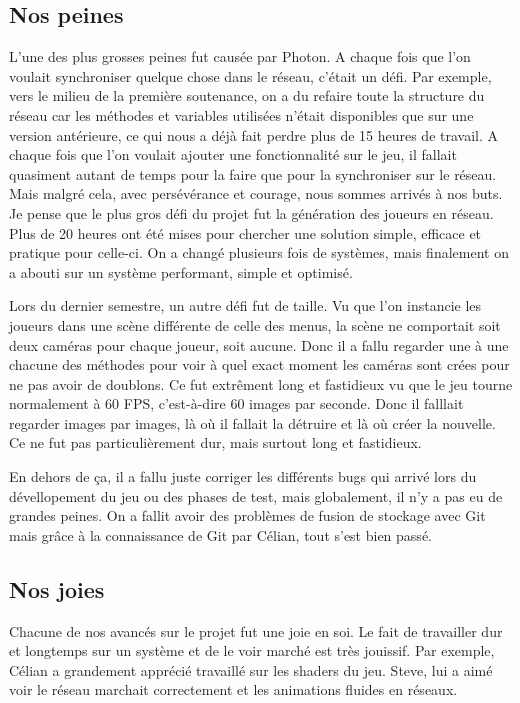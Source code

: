 \documentclass{article}
\begin{document}
\subsection{Nos peines}
L'une des plus grosses peines fut causée par Photon. A chaque fois que l'on voulait synchroniser quelque chose dans le réseau, c'était un défi. Par exemple, vers le milieu de la première soutenance, on a du refaire toute la structure du réseau car les méthodes et variables utilisées n'était disponibles que sur une version antérieure, ce qui nous a déjà fait perdre plus de 15 heures de travail. A chaque fois que l'on voulait ajouter une fonctionnalité sur le jeu, il fallait quasiment autant de temps pour la faire que pour la synchroniser sur le réseau. Mais malgré cela, avec persévérance et courage, nous sommes arrivés à nos buts. Je pense que le plus gros défi du projet fut la génération des joueurs en réseau. Plus de 20 heures ont été mises pour chercher une solution simple, efficace et pratique pour celle-ci. On a changé plusieurs fois de systèmes, mais finalement on a abouti sur un système performant, simple et optimisé. 

Lors du dernier semestre, un autre défi fut de taille. Vu que l'on instancie les joueurs dans une scène différente de celle des menus, la scène ne comportait soit deux caméras pour chaque joueur, soit aucune. Donc il a fallu regarder une à une chacune des méthodes pour voir à quel exact moment les caméras sont crées pour ne pas avoir de doublons. Ce fut extrêment long et fastidieux vu que le jeu tourne normalement à 60 FPS, c'est-à-dire 60 images par seconde. Donc il falllait regarder images par images, là où il fallait la détruire et là où créer la nouvelle. Ce ne fut pas particulièrement dur, mais surtout long et fastidieux.

En dehors de ça, il a fallu juste corriger les différents bugs qui arrivé lors du dévellopement du jeu ou des phases de test, mais globalement, il n'y a pas eu de grandes peines. On a fallit avoir des problèmes de fusion de stockage avec Git mais grâce à la connaissance de Git par Célian, tout s'est bien passé.

\subsection{Nos joies}
Chacune de nos avancés sur le projet fut une joie en soi. Le fait de travailler dur et longtemps sur un système et de le voir marché est très jouissif. Par exemple, Célian a grandement apprécié travaillé sur les shaders du jeu. Steve, lui a aimé voir le réseau marchait correctement et les animations fluides en réseaux. 
\end{document}
